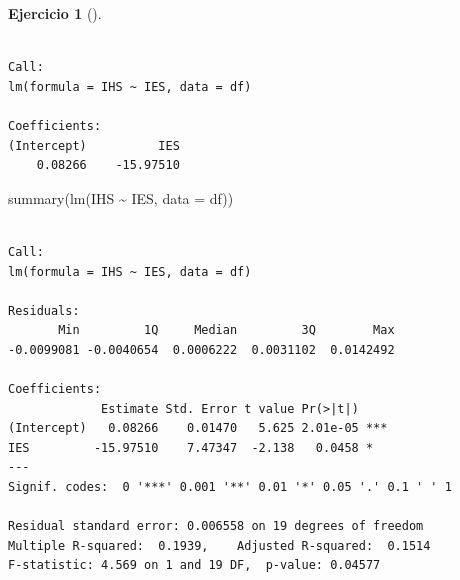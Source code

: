 \documentclass[
  spanish,
  a4paper,
]{scrreport}
\newenvironment{Shaded}{\begin{snugshade}}{\end{snugshade}}
\newcommand{\AttributeTok}[1]{\textcolor[rgb]{0.40,0.45,0.13}{#1}}
\newcommand{\FunctionTok}[1]{\textcolor[rgb]{0.28,0.35,0.67}{#1}}
\newcommand{\NormalTok}[1]{\textcolor[rgb]{0.00,0.23,0.31}{#1}}
\newcommand{\SpecialCharTok}[1]{\textcolor[rgb]{0.37,0.37,0.37}{#1}}
\theoremstyle{definition}
\newtheorem{exercise}{Ejercicio}[chapter]
\theoremstyle{definition}
\theoremstyle{remark}
\begin{document}
\begin{exercise}[]
\begin{enumerate}
\begin{tcolorbox}
\begin{verbatim}

Call:
lm(formula = IHS ~ IES, data = df)

Coefficients:
(Intercept)          IES  
    0.08266    -15.97510  
\end{verbatim}

\begin{Shaded}
\begin{Highlighting}[]
\FunctionTok{summary}\NormalTok{(}\FunctionTok{lm}\NormalTok{(IHS }\SpecialCharTok{\textasciitilde{}}\NormalTok{ IES, }\AttributeTok{data =}\NormalTok{ df))}
\end{Highlighting}
\end{Shaded}

\begin{verbatim}

Call:
lm(formula = IHS ~ IES, data = df)

Residuals:
       Min         1Q     Median         3Q        Max 
-0.0099081 -0.0040654  0.0006222  0.0031102  0.0142492 

Coefficients:
             Estimate Std. Error t value Pr(>|t|)    
(Intercept)   0.08266    0.01470   5.625 2.01e-05 ***
IES         -15.97510    7.47347  -2.138   0.0458 *  
---
Signif. codes:  0 '***' 0.001 '**' 0.01 '*' 0.05 '.' 0.1 ' ' 1

Residual standard error: 0.006558 on 19 degrees of freedom
Multiple R-squared:  0.1939,    Adjusted R-squared:  0.1514 
F-statistic: 4.569 on 1 and 19 DF,  p-value: 0.04577
\end{verbatim}

  \end{tcolorbox}
\end{enumerate}

\end{exercise}
\end{document}
